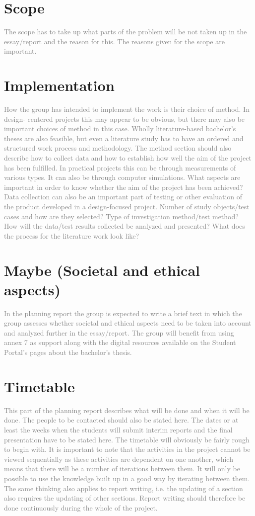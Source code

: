 \documentclass[12pt,a4paper]{article}
\begin{document}
\section{Scope}
\textcolor{gray}{
The scope has to take up what parts of the problem will be not taken up in the essay/report
and the reason for this. The reasons given for the scope are important.
}
\section{Implementation}
\textcolor{gray}{
How the group has intended to implement the work is their choice of method. In design-
centered projects this may appear to be obvious, but there may also be important choices of
method in this case. Wholly literature-based bachelor’s theses are also feasible, but even a
literature study has to have an ordered and structured work process and methodology.
The method section should also describe how to collect data and how to establish how well
the aim of the project has been fulfilled. In practical projects this can be through
measurements of various types. It can also be through computer simulations. What aspects
are important in order to know whether the aim of the project has been achieved? Data
collection can also be an important part of testing or other evaluation of the product
developed in a design-focused project.
Number of study objects/test cases and how are they selected? Type of investigation
method/test method? How will the data/test results collected be analyzed and presented?
What does the process for the literature work look like?
}
\section{Maybe (Societal and ethical aspects)}
\textcolor{gray}{
In the planning report the group is expected to write a brief text in which the group assesses
whether societal and ethical aspects need to be taken into account and analyzed further in
the essay/report. The group will benefit from using annex 7 as support along with the digital
resources available on the Student Portal’s pages about the bachelor’s thesis.
}
\section{Timetable}
\textcolor{gray}{
This part of the planning report describes what will be done and when it will be done. The
people to be contacted should also be stated here. The dates or at least the weeks when the
students will submit interim reports and the final presentation have to be stated here. The
timetable will obviously be fairly rough to begin with.
It is important to note that the activities in the project cannot be viewed sequentially as
these activities are dependent on one another, which means that there will be a number of
iterations between them. It will only be possible to use the knowledge built up in a good way
by iterating between them. The same thinking also applies to report writing, i.e. the
updating of a section also requires the updating of other sections. Report writing should
therefore be done continuously during the whole of the project.
}
\end{document}
